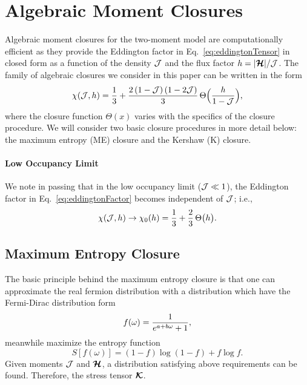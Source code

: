 \section{Algebraic Moment Closures}
\label{sec:algebraicClosure}

Algebraic moment closures for the two-moment model are computationally efficient as they provide the Eddington factor in Eq.~\eqref{eq:eddingtonTensor} in closed form as a function of the density $\mathcal{J}$ and the flux factor $h=|\boldsymbol{\mathcal{H}}|/\mathcal{J}$.  
The family of algebraic closures we consider in this paper can be written in the form \cite{cernohorskyBludman_1994}
\begin{equation}
  \chi(\mathcal{J},h)=\frac{1}{3}+\frac{2\,(1-\mathcal{J})\,(1-2\mathcal{J})}{3}\,\Theta\Big(\frac{h}{1-\mathcal{J}}\Big),
  \label{eq:eddingtonFactor}
\end{equation}
where the closure function $\Theta(x)$ varies with the specifics of the closure procedure.  
We will consider two basic closure procedures in more detail below: the maximum entropy (ME) closure and the Kershaw (K) closure.  

\paragraph{Low Occupancy Limit}
We note in passing that in the low occupancy limit ($\mathcal{J}\ll1$), the Eddington factor in Eq.~\eqref{eq:eddingtonFactor} becomes independent of $\mathcal{J}$; i.e.,
\begin{equation}
  \chi(\mathcal{J},h)\to\chi_{0}(h)=\frac{1}{3}+\frac{2}{3}\,\Theta\big(h\big).  
  \label{eq:eddingtonFactorLow}
\end{equation}

\subsection{Maximum Entropy Closure}

The basic principle behind the maximum entropy closure is that one can approximate the real fermion distribution with a distribution which have the Fermi-Dirac distribution form 
\begin{equation}
f(\omega)=\frac{1}{e^{a + b\omega}+1}, 
\end{equation} 
meanwhile maximize the entropy function
\begin{equation}
S[f(\omega)] = (1-f)\log(1-f) + f\log f.
\end{equation} 
Given moments $\mathcal{J}$ and $\boldsymbol{\mathcal{H}}$, a distribution satisfying above requirements can be found. 
Therefore, the stress tensor $\boldsymbol{\mathcal{K}}$.

